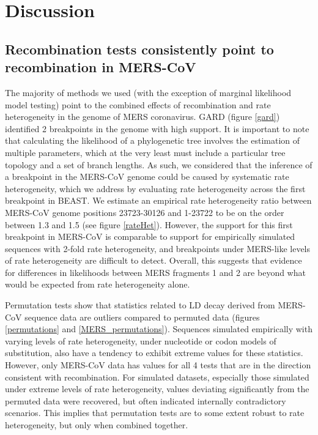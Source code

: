 \documentclass[11pt,oneside,letterpaper]{article}
\begin{document}
\section*{Discussion}
\subsection*{Recombination tests consistently point to recombination in MERS-CoV}
The majority of methods we used (with the exception of marginal likelihood model testing) point to the combined effects of recombination and rate heterogeneity in the genome of MERS coronavirus.
GARD (figure \ref{gard}) identified 2 breakpoints in the genome with high support.
It is important to note that calculating the likelihood of a phylogenetic tree involves the estimation of multiple parameters, which at the very least must include a particular tree topology and a set of branch lengths.
As such, we considered that the inference of a breakpoint in the MERS-CoV genome could be caused by systematic rate heterogeneity, which we address by evaluating rate heterogeneity across the first breakpoint in BEAST.
We estimate an empirical rate heterogeneity ratio between MERS-CoV genome positions 23723-30126 and 1-23722 to be on the order between 1.3 and 1.5 (see figure \ref{rateHet}).
However, the support for this first breakpoint in MERS-CoV is comparable to support for empirically simulated sequences with 2-fold rate heterogeneity, and breakpoints under MERS-like levels of rate heterogeneity are difficult to detect.
Overall, this suggests that evidence for differences in likelihoods between MERS fragments 1 and 2 are beyond what would be expected from rate heterogeneity alone.

Permutation tests show that statistics related to LD decay derived from MERS-CoV sequence data are outliers compared to permuted data (figures \ref{permutations} and \ref{MERS_permutations}).
Sequences simulated empirically with varying levels of rate heterogeneity, under nucleotide or codon models of substitution, also have a tendency to exhibit extreme values for these statistics.
However, only MERS-CoV data has values for all 4 tests that are in the direction consistent with recombination.
For simulated datasets, especially those simulated under extreme levels of rate heterogeneity, values deviating significantly from the permuted data were recovered, but often indicated internally contradictory scenarios.
This implies that permutation tests are to some extent robust to rate heterogeneity, but only when combined together.
\end{document}
